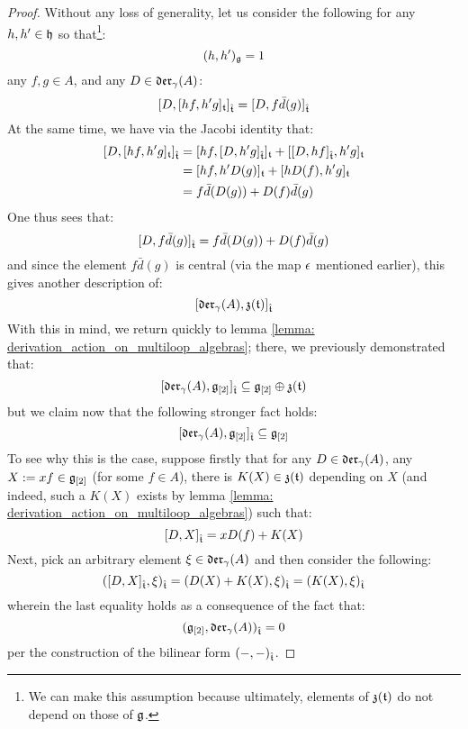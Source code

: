             \begin{proof}
                Without any loss of generality, let us consider the following for any $h, h' \in \mathfrak{h}$ so that\footnote{We can make this assumption because ultimately, elements of $\mathfrak{z}(\mathfrak{t})$ do not depend on those of $\mathfrak{g}$.}:
                    $$(h, h')_{\mathfrak{g}} = 1$$
                any $f, g \in A$, and any $D \in \mathfrak{der}_{\gamma}(A)$:
                    $$[ D, [h f, h' g]_{\mathfrak{t}} ]_{\hat{\mathfrak{t}}} = [ D, f \bar{d}( g ) ]_{\hat{\mathfrak{t}}}$$
                At the same time, we have via the Jacobi identity that:
                    $$
                        \begin{aligned}
                            [ D, [h f, h' g]_{\toroidal} ]_{\extendedtoroidal} & = [ h f, [D, h' g]_{\extendedtoroidal} ]_{\toroidal} + [ [D, h f]_{\extendedtoroidal}, h' g ]_{\toroidal}
                            \\
                            & = [ h f, h' D( g ) ]_{\toroidal} + [ h D( f ), h' g ]_{\toroidal}
                            \\
                            & = f \bar{d}( D( g ) ) + D( f ) \bar{d}(g)
                        \end{aligned}
                    $$
                One thus sees that:
                    $$[ D, f \bar{d}( g ) ]_{\hat{\mathfrak{t}}} = f \bar{d}( D( g ) ) + D( f ) \bar{d}(g)$$
                and since the element $f \bar{d}( g )$ is central (via the map $\epsilon$ mentioned earlier), this gives another description of:
                    $$[ \mathfrak{der}_{\gamma}(A), \mathfrak{z}(\mathfrak{t}) ]_{\hat{\mathfrak{t}}}$$
                With this in mind, we return quickly to lemma \ref{lemma: derivation_action_on_multiloop_algebras}; there, we previously demonstrated that:
                    $$[ \mathfrak{der}_{\gamma}(A), \mathfrak{g}_{[2]} ]_{\hat{\mathfrak{t}}} \subseteq \mathfrak{g}_{[2]} \oplus \mathfrak{z}(\mathfrak{t})$$
                but we claim now that the following stronger fact holds:
                    $$[ \mathfrak{der}_{\gamma}(A), \mathfrak{g}_{[2]} ]_{\hat{\mathfrak{t}}} \subseteq \mathfrak{g}_{[2]}$$
                To see why this is the case, suppose firstly that for any $D \in \mathfrak{der}_{\gamma}(A)$, any $X := x f \in \mathfrak{g}_{[2]}$ (for some $f \in A$), there is $K(X) \in \mathfrak{z}(\mathfrak{t})$ depending on $X$ (and indeed, such a $K(X)$ exists by lemma \ref{lemma: derivation_action_on_multiloop_algebras}) such that:
                    $$[ D, X ]_{\hat{\mathfrak{t}}} = x D( f ) + K(X)$$
                Next, pick an arbitrary element $\xi \in \mathfrak{der}_{\gamma}(A)$ and then consider the following:
                    $$( [ D, X ]_{\hat{\mathfrak{t}}}, \xi )_{\hat{\mathfrak{t}}} = (D(X) + K(X), \xi)_{\hat{\mathfrak{t}}} = (K(X), \xi)_{\hat{\mathfrak{t}}}$$
                wherein the last equality holds as a consequence of the fact that:
                    $$( \mathfrak{g}_{[2]}, \mathfrak{der}_{\gamma}(A) )_{\hat{\mathfrak{t}}} = 0$$
                per the construction of the bilinear form $(-, -)_{\hat{\mathfrak{t}}}$.
            \end{proof}
